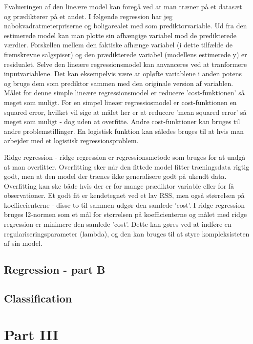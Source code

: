 \documentclass{report}
\begin{document}
Evalueringen af den lineære model kan foregå ved at man træner på et datasæt og prædikterer på et andet. I følgende regression har jeg nabokvadratmeterpriserne og boligarealet med som prediktorvariable. 
Ud fra den estimerede model kan man plotte sin afhængige variabel mod de predikterede værdier.
Forskellen mellem den faktiske afhænge variabel (i dette tilfælde de fremskrevne salgspiser) og den prædikterede variabel (modellens estimerede y) er residualet.
Selve den lineære regressionsmodel kan anvanceres ved at tranformere inputvariablene. Det kan eksempelvis være at opløfte variablene i anden potens og bruge dem som prediktor sammen med den originale version af variablen.
Målet for denne simple lineære regressionsmodel er reducere 'cost-funktionen' så meget som muligt. For en simpel lineær regressiosmodel er cost-funktionen en squared error, hvilket vil sige at målet her er at reducere 'mean squared error' så meget som muligt - dog uden at overfitte. 
Andre cost-funktioner kan bruges til andre problemstillinger. En logistisk funktion kan således bruges til at hvis man arbejder med et logistisk regressionsproblem. 


Ridge regression - ridge regression er regressionsmetode som bruges for at undgå at man overfitter. Overfitting sker når den fittede model fitter træningsdata rigtig godt, men at den model der trænes ikke generalisere godt på ukendt data. Overfitting kan ske både hvis der er for mange prædiktor variable eller for få observationer. 
Et godt fit er kendetegnet ved et lav RSS, men også størrelsen på koeffiecienterne - disse to til sammen udgør den samlede 'cost'. I ridge regression bruges l2-normen som et mål for størrelsen på koefficienterne og målet med ridge regression er minimere den samlede 'cost'.
Dette kan gøres ved at indføre en regulariseringsparameter (lambda), og den kan bruges til at styre kompleksisteten af sin model. 





\section{Regression - part B}

\section{Classification}

\chapter{Part III}
\end{document}
